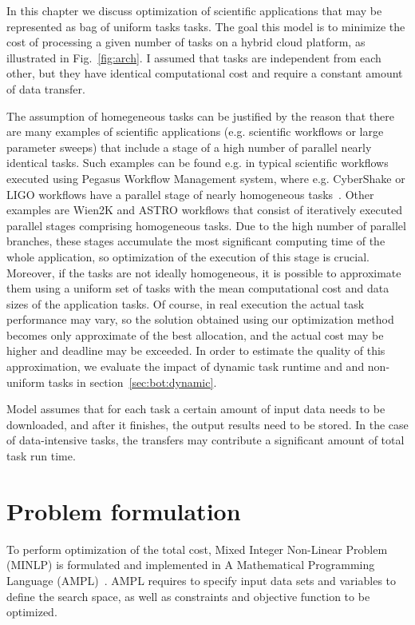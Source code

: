 {  In this chapter we discuss optimization of scientific applications that may be represented as bag of uniform tasks tasks. The goal this model is to minimize the cost of processing a given number of tasks on a hybrid cloud platform, as illustrated in Fig.~\ref{fig:arch}. I assumed that tasks are independent from each other, but they have identical computational cost and require a constant amount of data transfer. 

  The assumption of homegeneous tasks can be justified by the reason that there are many examples of scientific applications (e.g. scientific workflows or large parameter sweeps) that include a stage of a high number of parallel nearly identical tasks. Such examples can be found e.g. in typical scientific workflows executed using Pegasus Workflow Management system, where e.g. CyberShake or LIGO workflows have a parallel stage of nearly homogeneous tasks~\cite{Bharathi08}. Other examples are Wien2K and ASTRO workflows that consist of iteratively executed parallel stages comprising homogeneous tasks\cite{Duan12}. Due to the high number of parallel branches, these stages accumulate the most significant computing time of the whole application, so optimization of the execution of this stage is crucial.
Moreover, if the tasks are not ideally homogeneous, it is possible to approximate them using a uniform set of tasks with the mean computational cost and data sizes of the application tasks. Of course, in real execution the actual task performance may vary, so the solution obtained using our optimization method becomes only approximate of the best allocation, and the actual cost may be higher and deadline may be exceeded. In order to estimate the quality of this approximation, we evaluate the impact of dynamic task runtime and and non-uniform tasks in section~\ref{sec:bot:dynamic}. 

  Model assumes that for each task a certain amount of input data needs to be downloaded, and after it finishes, the output results need to be stored. In the case of data-intensive tasks, the transfers may contribute a significant amount of total task run time.

\section{Problem formulation}
\label{sec:bot:problem}

  To perform optimization of the total cost, Mixed Integer Non-Linear Problem (MINLP) is formulated and implemented in A Mathematical Programming Language (AMPL)~\cite{Fourer2002}.  AMPL requires to specify input data sets and variables to define the search space, as well as constraints and objective function to be optimized.

}
